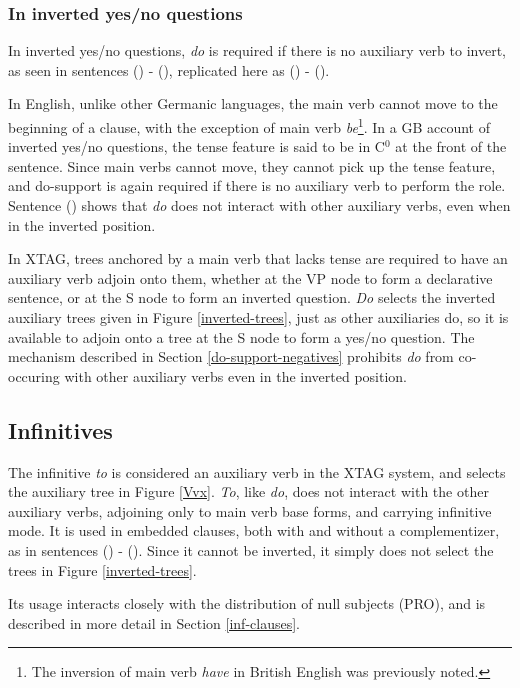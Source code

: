 
\subsubsection{In inverted yes/no questions}

In inverted yes/no questions, {\it do} is required if there is no auxiliary
verb to invert, as seen in sentences () - (), replicated here
as () - ().


In English, unlike other Germanic languages, the main verb cannot move to the
beginning of a clause, with the exception of main verb {\it be}\footnote{The
inversion of main verb {\it have} in British English was previously noted.}.
In a GB account of inverted yes/no questions, the tense feature is said to be
in C$^{0}$ at the front of the sentence.  Since main verbs cannot move, they
cannot pick up the tense feature, and do-support is again required if there is
no auxiliary verb to perform the role.  Sentence () shows that {\it do}
does not interact with other auxiliary verbs, even when in the inverted
position.

In XTAG, trees anchored by a main verb that lacks tense are required to have an
auxiliary verb adjoin onto them, whether at the VP node to form a declarative
sentence, or at the S node to form an inverted question.  {\it Do} selects the
inverted auxiliary trees given in Figure \ref{inverted-trees}, just as other
auxiliaries do, so it is available to adjoin onto a tree at the S node to form
a yes/no question.  The mechanism described in Section \ref{do-support-negatives} 
prohibits {\it do} from co-occuring with other auxiliary verbs even in the
inverted position.


\subsection{Infinitives}

The infinitive {\it to} is considered an auxiliary verb in the XTAG system, and
selects the auxiliary tree in Figure \ref{Vvx}.  {\it To}, like {\it do}, does
not interact with the other auxiliary verbs, adjoining only to main verb base
forms, and carrying infinitive mode.  It is used in embedded clauses, both with
and without a complementizer, as in sentences () - ().  Since it
cannot be inverted, it simply does not select the trees in Figure
\ref{inverted-trees}.


Its usage interacts closely with the distribution of null subjects (PRO), and
is described in more detail in Section \ref{inf-clauses}.
